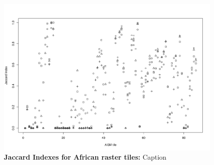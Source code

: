 	\begin{landscape}
		\begin{figure}[ht]
			\centering
			\includegraphics[scale=.65]{img/jaccard_tiles_africa}
			\caption[Jaccard Indexes for African raster tiles]{\textbf{Jaccard Indexes for African raster tiles:} Caption}
			\label{fig:jaccard_africa_appendix}
		\end{figure}
	\end{landscape}

